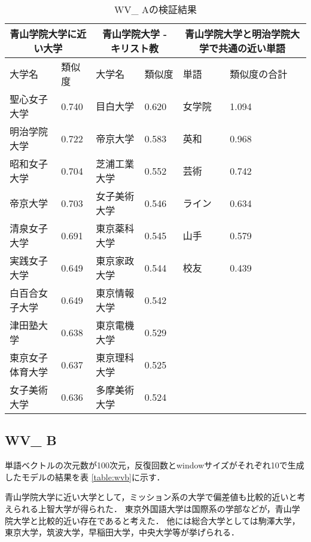 \begin{table}[H]
\caption{WV\_ Aの検証結果}
\centering
\footnotesize
\begin{tabular}{ll|ll|ll}
\hline
\multicolumn{2}{c}{青山学院大学に近い大学} & \multicolumn{2}{c}{青山学院大学 - キリスト教} & \multicolumn{2}{c}{青山学院大学と明治学院大学で共通の近い単語}
\\ \hline
大学名 & 類似度 & 大学名 & 類似度 & 単語 & 類似度の合計
\\ \hline \hline
聖心女子大学 & 0.740 & 目白大学 & 0.620 & 女学院 & 1.094\\
明治学院大学 & 0.722 & 帝京大学 & 0.583 & 英和 & 0.968\\
昭和女子大学 & 0.704 & 芝浦工業大学 & 0.552 & 芸術 & 0.742\\
帝京大学 & 0.703 & 女子美術大学 & 0.546 & ライン & 0.634\\
清泉女子大学 & 0.691 & 東京薬科大学 & 0.545 & 山手 & 0.579\\
実践女子大学 & 0.649 & 東京家政大学 & 0.544 & 校友 & 0.439\\
白百合女子大学 & 0.649 & 東京情報大学 & 0.542 & & \\
津田塾大学 & 0.638 & 東京電機大学 & 0.529 & & \\
東京女子体育大学 & 0.637 & 東京理科大学 & 0.525 & & \\
女子美術大学 & 0.636 & 多摩美術大学 & 0.524 & & \\ \hline
\end{tabular}
\label{table:wva}
\end{table}



\subsection{WV\_ B}
単語ベクトルの次元数が100次元，反復回数とwindowサイズがそれぞれ10で生成したモデルの結果を表 \ref{table:wvb}に示す．

青山学院大学に近い大学として，ミッション系の大学で偏差値も比較的近いと考えられる上智大学が得られた．
東京外国語大学は国際系の学部などが，青山学院大学と比較的近い存在であると考えた．
他には総合大学としては駒澤大学，東京大学，筑波大学，早稲田大学，中央大学等が挙げられる．

